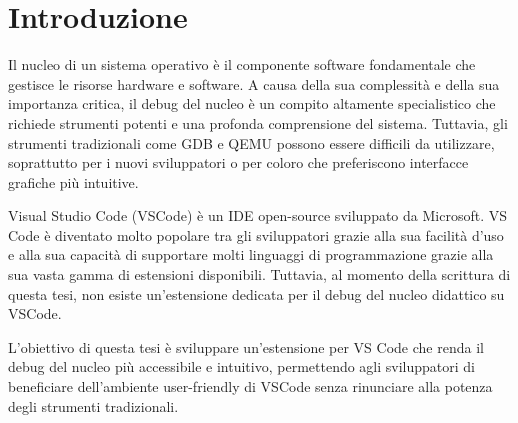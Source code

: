\chapter{Introduzione}
Il nucleo di un sistema operativo è il componente software fondamentale che gestisce le risorse hardware e software. A causa della sua complessità e della sua importanza critica, il debug del nucleo è un compito altamente specialistico che richiede strumenti potenti e una profonda comprensione del sistema. Tuttavia, gli strumenti tradizionali come GDB e QEMU possono essere difficili da utilizzare, soprattutto per i nuovi sviluppatori o per coloro che preferiscono interfacce grafiche più intuitive.

Visual Studio Code (VSCode) è un IDE open-source sviluppato da Microsoft. VS Code è diventato molto popolare tra gli sviluppatori grazie alla sua facilità d'uso e alla sua capacità di supportare molti linguaggi di programmazione grazie alla sua vasta gamma di estensioni disponibili. Tuttavia, al momento della scrittura di questa tesi, non esiste un'estensione dedicata per il debug del nucleo didattico su VSCode.

L'obiettivo di questa tesi è sviluppare un'estensione per VS Code che renda il debug del nucleo più accessibile e intuitivo, permettendo agli sviluppatori di beneficiare dell'ambiente user-friendly di VSCode senza rinunciare alla potenza degli strumenti tradizionali.
